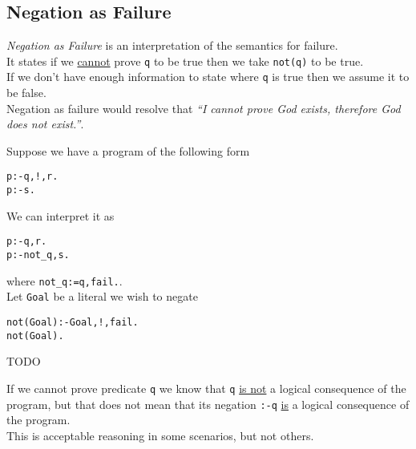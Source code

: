\documentclass[11pt,a4paper]{article}
\begin{document}

\subsection{Negation as Failure}

\textit{Negation as Failure} is an interpretation of the semantics for failure.\\
It states if we \underline{cannot} prove \lstinline!q! to be true then we take \lstinline!not(q)! to be true.\\
\ie If we don't have enough information to state where \lstinline!q! is true then we assume it to be false.\\
\eg Negation as failure would resolve that \textit{``I cannot prove God exists, therefore God does not exist.''}.\\


Suppose we have a program of the following form
\begin{lstlisting}
p:-q,!,r.
p:-s.
\end{lstlisting}
We can interpret it as
\begin{lstlisting}
p:-q,r.
p:-not_q,s.
\end{lstlisting}
where \lstinline!not_q:=q,fail.!.\\

Let \lstinline!Goal! be a literal we wish to negate
\begin{lstlisting}
not(Goal):-Goal,!,fail.
not(Goal).
\end{lstlisting}

TODO\\


If we cannot prove predicate \lstinline!q! we know that \lstinline!q! \underline{is not} a logical consequence of the program, but that does not mean that its negation \lstinline!:-q! \underline{is} a logical consequence of the program.\\
This is acceptable reasoning in some scenarios, but not others.\\
\end{document}
